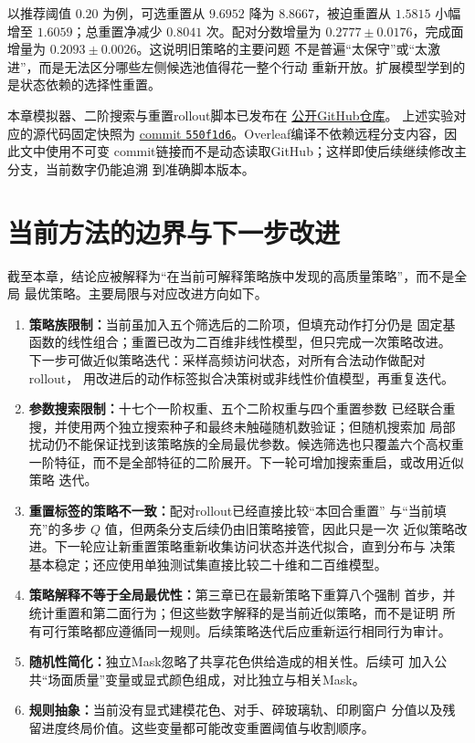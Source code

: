 \documentclass[UTF8,11pt,openany]{ctexrep}
\begin{document}
以推荐阈值 $0.20$ 为例，可选重置从 $9.6952$ 降为 $8.8667$，被迫重置从
$1.5815$ 小幅增至 $1.6059$；总重置净减少 $0.8041$ 次。配对分数增量为
$0.2777\pm0.0176$，完成面增量为 $0.2093\pm0.0026$。这说明旧策略的主要问题
不是普遍“太保守”或“太激进”，而是无法区分哪些左侧候选池值得花一整个行动
重新开放。扩展模型学到的是状态依赖的选择性重置。

本章模拟器、二阶搜索与重置rollout脚本已发布在
\href{https://github.com/CYZ-gmail/azul-stained-glass-strategy}{公开GitHub仓库}。
上述实验对应的源代码固定快照为
\href{https://github.com/CYZ-gmail/azul-stained-glass-strategy/commit/550f1d63434b215ae0770dcfb57493ef20f6c063}%
{commit \texttt{550f1d6}}。Overleaf编译不依赖远程分支内容，因此文中使用不可变
commit链接而不是动态读取GitHub；这样即使后续继续修改主分支，当前数字仍能追溯
到准确脚本版本。

\section{当前方法的边界与下一步改进}

截至本章，结论应被解释为“在当前可解释策略族中发现的高质量策略”，而不是全局
最优策略。主要局限与对应改进方向如下。

\begin{enumerate}[leftmargin=*]
    \item \textbf{策略族限制：}当前虽加入五个筛选后的二阶项，但填充动作打分仍是
    固定基函数的线性组合；重置已改为二百维非线性模型，但只完成一次策略改进。
    下一步可做近似策略迭代：采样高频访问状态，对所有合法动作做配对rollout，
    用改进后的动作标签拟合决策树或非线性价值模型，再重复迭代。
    \item \textbf{参数搜索限制：}十七个一阶权重、五个二阶权重与四个重置参数
    已经联合重搜，并使用两个独立搜索种子和最终未触碰随机数验证；但随机搜索加
    局部扰动仍不能保证找到该策略族的全局最优参数。候选筛选也只覆盖六个高权重
    一阶特征，而不是全部特征的二阶展开。下一轮可增加搜索重启，或改用近似策略
    迭代。
    \item \textbf{重置标签的策略不一致：}配对rollout已经直接比较“本回合重置”
    与“当前填充”的多步 $Q$ 值，但两条分支后续仍由旧策略接管，因此只是一次
    近似策略改进。下一轮应让新重置策略重新收集访问状态并迭代拟合，直到分布与
    决策基本稳定；还应使用单独测试集直接比较二十维和二百维模型。
    \item \textbf{策略解释不等于全局最优性：}第三章已在最新策略下重算八个强制
    首步，并统计重置和第二面行为；但这些数字解释的是当前近似策略，而不是证明
    所有可行策略都应遵循同一规则。后续策略迭代后应重新运行相同行为审计。
    \item \textbf{随机性简化：}独立Mask忽略了共享花色供给造成的相关性。后续可
    加入公共“场面质量”变量或显式颜色组成，对比独立与相关Mask。
    \item \textbf{规则抽象：}当前没有显式建模花色、对手、碎玻璃轨、印刷窗户
    分值以及残留进度终局价值。这些变量都可能改变重置阈值与收割顺序。
\end{enumerate}
\end{document}
